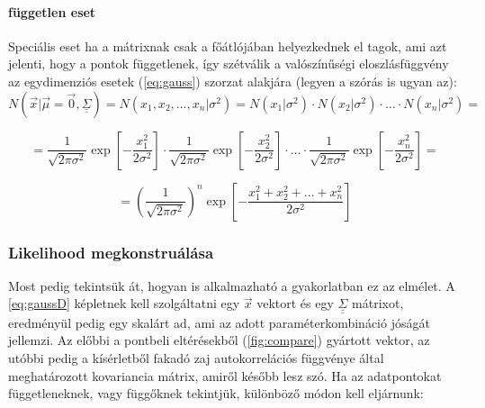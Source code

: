 \paragraph{független eset}
Speciális eset ha a mátrixnak csak a főátlójában helyezkednek el tagok, ami azt jelenti, hogy a pontok függetlenek, így szétválik a valószínűségi eloszlásfüggvény az egydimenziós esetek (\ref{eq:gauss}) szorzat alakjára (legyen a szórás is ugyan az):
\begin{equation}\label{eq:gauss_independent}
		N\left(\vec{x}|\vec{\mu}=\vec{0}, \underline{\underline{ \Sigma }}\right) = N\left(x_1, x_2, \ldots, x_n| \sigma^2\right) = N\left(x_1| \sigma^2\right)\cdot N\left( x_2| \sigma^2\right) \cdot \ldots \cdot N\left( x_n| \sigma^2\right) = 
\end{equation}

\begin{equation}
		= \dfrac{1}{\sqrt{2\pi \sigma^2}}\exp \left[-\dfrac{x_1^2}{2\sigma^2}\right] \cdot \dfrac{1}{\sqrt{2\pi \sigma^2}}\exp\left[-\dfrac{x_2^2}{2\sigma^2}\right] \cdot \ldots \cdot \dfrac{1}{\sqrt{2\pi \sigma^2}}\exp \left[-\dfrac{x_n^2}{2\sigma^2}\right] =
\end{equation}

\begin{equation}
	=  \left(\dfrac{1}{\sqrt{2\pi \sigma^2}}\right)^n \exp \left[-\dfrac{x_1^2 + x_2^2 + \ldots + x_n^2}{2\sigma^2}\right]
\end{equation}


\subsubsection{Likelihood megkonstruálása}
Most pedig tekintsük át, hogyan is alkalmazható a gyakorlatban ez az elmélet. A \ref{eq:gaussD} képletnek kell szolgáltatni egy $\vec{x}$ vektort és egy $\underline{\underline{\Sigma}}$ mátrixot, eredményül pedig egy skalárt ad, ami az adott paraméterkombináció jóságát jellemzi. Az előbbi a pontbeli eltérésekből (\ref{fig:compare}) gyártott vektor, az utóbbi pedig a kísérletből fakadó zaj autokorrelációs függvénye által meghatározott kovariancia mátrix, amiről később lesz szó.
Ha az adatpontokat függetleneknek, vagy függőknek tekintjük, különböző módon kell eljárnunk:
 
